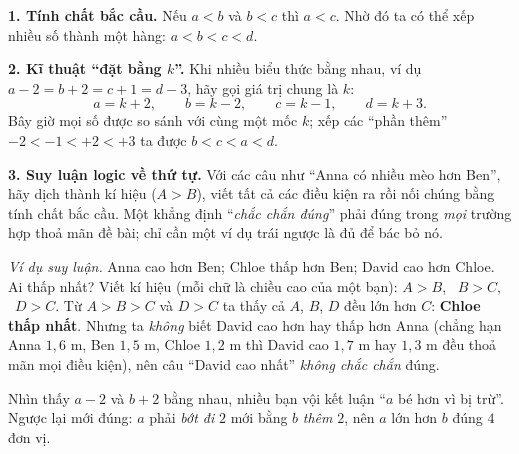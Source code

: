 \begin{knowbox}
\textbf{1. Tính chất bắc cầu.} Nếu $a<b$ và $b<c$ thì $a<c$. Nhờ đó ta có thể xếp nhiều số thành một hàng: $a<b<c<d$.

\textbf{2. Kĩ thuật ``đặt bằng $k$''.} Khi nhiều biểu thức bằng nhau, ví dụ $a-2=b+2=c+1=d-3$, hãy gọi giá trị chung là $k$:
\[a=k+2,\qquad b=k-2,\qquad c=k-1,\qquad d=k+3.\]
Bây giờ mọi số được so sánh với cùng một mốc $k$; xếp các ``phần thêm'' $-2<-1<+2<+3$ ta được $b<c<a<d$.
\begin{center}\end{center}

\textbf{3. Suy luận logic về thứ tự.} Với các câu như ``Anna có nhiều mèo hơn Ben'', hãy dịch thành kí hiệu ($A>B$),
viết tất cả các điều kiện ra rồi nối chúng bằng tính chất bắc cầu. Một khẳng định ``\emph{chắc chắn đúng}'' phải đúng trong
\emph{mọi} trường hợp thoả mãn đề bài; chỉ cần một ví dụ trái ngược là đủ để bác bỏ nó.
\end{knowbox}

\begin{tipbox}
\emph{Ví dụ suy luận.} Anna cao hơn Ben; Chloe thấp hơn Ben; David cao hơn Chloe. Ai thấp nhất?
Viết kí hiệu (mỗi chữ là chiều cao của một bạn): $A>B$, \ $B>C$, \ $D>C$. Từ $A>B>C$ và $D>C$ ta thấy cả $A$, $B$, $D$ đều lớn hơn $C$: \textbf{Chloe thấp nhất}.
Nhưng ta \emph{không} biết David cao hơn hay thấp hơn Anna (chẳng hạn Anna $1{,}6$ m, Ben $1{,}5$ m, Chloe $1{,}2$ m thì David cao $1{,}7$ m hay $1{,}3$ m đều thoả mãn mọi điều kiện), nên câu ``David cao nhất'' \emph{không chắc chắn} đúng.
\end{tipbox}

\begin{warnbox}
Nhìn thấy $a-2$ và $b+2$ bằng nhau, nhiều bạn vội kết luận ``$a$ bé hơn vì bị trừ''. Ngược lại mới đúng: $a$ phải \emph{bớt đi} $2$
mới bằng $b$ \emph{thêm} $2$, nên $a$ lớn hơn $b$ đúng $4$ đơn vị.
\end{warnbox}

